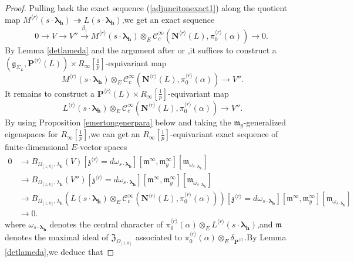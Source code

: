 \documentclass[SecEq,CM,GP]{degruyter-crelle} %
\theoremstyle{plain}
\newcommand{\lrr}{{\langle r\rangle}}
\newcommand{\omepik}{\Omega_{[1,k]}}
\newcommand{\te}{{\otimes_E}}
\newcommand{\bN}{{\mathbf{N}}}
\newcommand{\bP}{{\mathbf{P}}}
\newcommand{\bh}{{\mathbf{h}}}
\newcommand{\cC}{\mathcal C}
\newcommand{\fm}{{\mathfrak{m}}}
\newcommand{\fz}{{\mathfrak{z}}}
\begin{document}
\begin{proof}
Pulling back the exact sequence (\ref{adjuncitonexact1}) along the quotient map $M^{\lrr}(s\cdot{\bm\lambda}_\bh)\twoheadrightarrow L(s\cdot{\bm\lambda}_\bh)$,\;we get an exact sequence 
\begin{equation}\label{adjuncitonexact2}
	0\rightarrow V \rightarrow  V'' \xrightarrow{\beta_1}  M^{\lrr}(s\cdot{\bm\lambda}_\bh)\otimes_E\cC^{\infty}_c(\bN^{\lrr}(L),\pi_0^{\lrr}(\alpha))
	\rightarrow0.\;
\end{equation}
By Lemma \ref{detlameda}  and the argument after \cite[(80)]{2019DINGSimple} or \cite[(15)]{bergdall2018adjunction},\;it suffices to construct a $(\mathfrak{g}_{\Sigma_L},\bP^{\lrr}(L))\times R_{\infty}[\frac{1}{p}]$-equivariant map 
\begin{equation}\label{desiredhomo}
	M^{\lrr}(s\cdot{\bm\lambda}_\bh) \otimes_E\cC^{\infty}_c(\bN^{\lrr}(L),\pi_0^{\lrr}(\alpha))\rightarrow  V''.
\end{equation}
It remains to construct a $\bP^{\lrr}(L)\times R_{\infty}[\frac{1}{p}]$-equivariant map
\begin{equation}\label{desiredhomo1}
	L^{\lrr}(s\cdot{\bm\lambda}_\bh) \otimes_E\cC^{\infty}_c(\bN^{\lrr}(L),\pi_0^{\lrr}(\alpha))\rightarrow  V''.
\end{equation}
By using Proposition \ref{emertongenerpara} below and taking the $\fm_y$-generalized eigenspaces for $R_{\infty}[\frac{1}{p}]$,\;we can get an $R_{\infty}[\frac{1}{p}]$-equivariant exact sequence of finite-dimensional $E$-vector spaces
\begin{equation}
	\begin{aligned}
		0&\rightarrow B_{\omepik,\lambda_\bh}(V)[\fz^{\lrr}=d\omega_{s\cdot{\bm\lambda}_\bh}][\fm^\infty,\fm_y^\infty][
		\fm_{\omega_{s\cdot{\bm\lambda}_\bh}}]\\
		&\rightarrow B_{\omepik,\lambda_\bh}(V'')[\fz^{\lrr}=d\omega_{s\cdot{\bm\lambda}_\bh}][\fm^\infty,\fm_y^\infty][
		\fm_{\omega_{s\cdot{\bm\lambda}_\bh}}]\\
		&\rightarrow B_{\omepik,\lambda_\bh}(L(s\cdot{\bm\lambda}_\bh)\otimes_E\cC^{\infty}_c(\bN^{\lrr}(L),\pi_0^{\lrr}(\alpha)))[\fz^{\lrr}=d\omega_{s\cdot{\bm\lambda}_\bh}][\fm^\infty,\fm_y^\infty][
		\fm_{\omega_{s\cdot{\bm\lambda}_\bh}}]\\&\rightarrow 0.
	\end{aligned}
\end{equation}
where $\omega_{s\cdot{\bm\lambda}_\bh}$ denotes the central character of  $\pi_0^{\lrr}(\alpha)\te L^{\lrr}(s\cdot{\bm\lambda}_\bh)$,\;and $\fm$ denotes the maximal ideal of $\mathfrak{Z}_{\omepik}$ associated to $\pi_0^{\lrr}(\alpha)\te \delta_{\bP^{\lrr}}$.\;By Lemma \ref{detlameda},\;we deduce that

\end{proof}
\end{document}
